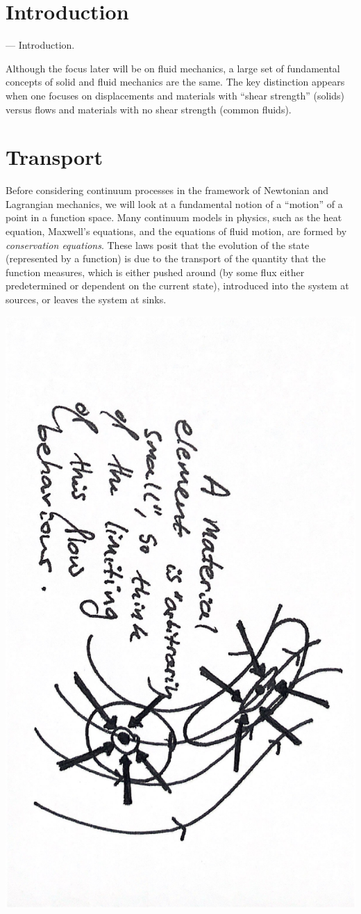 
\section{Introduction}
--- Introduction.

Although the focus later will be on fluid mechanics, a large set of fundamental concepts of solid and fluid mechanics
are the same. The key distinction appears when one focuses on displacements and materials with ``shear strength'' (solids)  versus flows
and materials with no shear strength (common fluids).


\section{Transport}
Before considering continuum processes in the framework of Newtonian and Lagrangian mechanics, we will look at a fundamental notion of a ``motion''
of a point in a function space. Many continuum models in physics, such as the heat equation,
Maxwell's equations, and the equations of fluid motion, are formed by \textit{conservation equations}. These laws posit that the
evolution of the state (represented by a function) is
due to the transport of the quantity that the function measures, which is either pushed around (by some flux either predetermined or dependent on the current state),
introduced into the system at sources, or leaves the system at sinks.

\begin{center}
\includegraphics[angle=90,page=11,width=0.56\linewidth]{figures/2.pdf}
\end{center}

